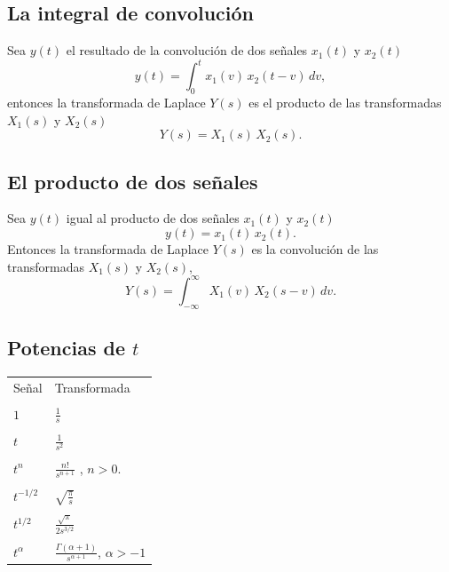 \subsection{La integral de convoluci\'{o}n}

Sea $y(t)$ el resultado de la convoluci\'{o}n de dos se\~{n}ales $x_{1}(t)$ y $x_{2}(t)$
\begin{equation}
 y(t) = \int_{0}^{t} x_{1}(v) \, x_{2}(t - v) \, dv,
\end{equation}
entonces
la transformada de Laplace $Y(s)$ es el producto de las transformadas $X_{1}(s)$ y $X_{2}(s)$
\begin{equation}
 Y(s) = X_{1}(s) \, X_{2}(s).
\end{equation}

\subsection{El producto de dos se\~{n}ales}

Sea $y(t)$ igual al producto de dos se\~{n}ales $x_{1}(t)$ y $x_{2}(t)$
\begin{equation}
 y(t) = x_{1}(t) \, x_{2}(t).
\end{equation}
Entonces la transformada de Laplace $Y(s)$ es la convoluci\'{o}n  de las transformadas $X_{1}(s)$ y $X_{2}(s)$,
\begin{equation}
 Y(s) = \int_{-\infty}^{\infty} X_{1}(v) \, X_{2}(s - v) \, dv.
\end{equation}


\subsection{Potencias de $t$}

\begin{center}
\begin{tabular}{ll}
Se\~{n}al                               &       Transformada                            \\
& \\
$1$ & $\frac{1}{s}$ \\ 
& \\
$t$ & $\frac{1}{s^{2}}$ \\ 
& \\
$t^n$ & $\frac{n!}{s^{n+1}}$ , $n>0.$ \\ 
& \\
$t^{-1/2} $ & $\sqrt{\frac{\pi }{s}}$ \\
& \\
$t^{1/2}$ & $\frac{\sqrt{\pi }}{2s^{3/2}}$ \\ 
& \\
$t^{\alpha }$ & $\frac{\Gamma \left( \alpha +1\right) }{s^{\alpha +1}}$, $\alpha >-1$
\end{tabular}
\end{center}


